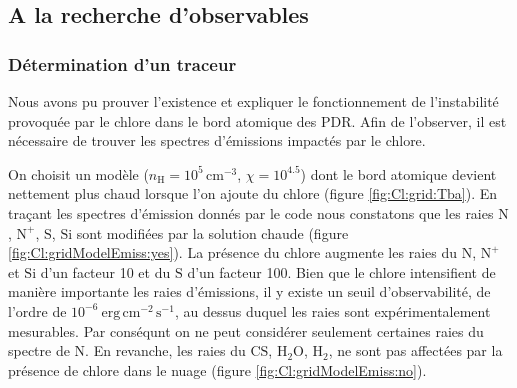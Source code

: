 
\subsection{A la recherche d'observables}
\subsubsection{Détermination d'un traceur}

Nous avons pu prouver l'existence et expliquer le fonctionnement de l'instabilité provoquée par le chlore dans le bord atomique des PDR. Afin de l'observer, il est nécessaire de trouver les spectres d'émissions impactés par le chlore. \newline 

On choisit un modèle ($n_\mathrm{H}=10^5 \, \mathrm{cm}^{-3}$, $\chi=10^{4.5}$) dont le bord atomique devient nettement plus chaud lorsque l'on ajoute du chlore (figure \ref{fig:Cl:grid:Tba}). En traçant les spectres d'émission donnés par le code nous constatons que les raies $\mathrm{N}$, $\mathrm{N}^+$, $\mathrm{S}$, $\mathrm{Si}$ sont modifiées par la solution chaude (figure \ref{fig:Cl:gridModelEmiss:yes}). La présence du chlore augmente les raies du $\mathrm{N}$, $\mathrm{N}^+$ et $\mathrm{Si}$ d'un facteur 10 et du $\mathrm{S}$ d'un facteur 100. Bien que le chlore intensifient de manière importante les raies d'émissions, il y existe un seuil d'observabilité, de l'ordre de $10^{-6} \ \mathrm{erg}\,\mathrm{cm}^{-2}\,\mathrm{s}^{-1}$, au dessus duquel les raies sont expérimentalement mesurables. Par conséqunt on ne peut considérer seulement certaines raies du spectre de $\mathrm{N}$. En revanche, les raies du $\mathrm{CS}$, $\mathrm{H}_2\mathrm{O}$, $\mathrm{H}_2$, ne sont pas affectées par la présence de chlore  dans le nuage (figure \ref{fig:Cl:gridModelEmiss:no}). \newline

